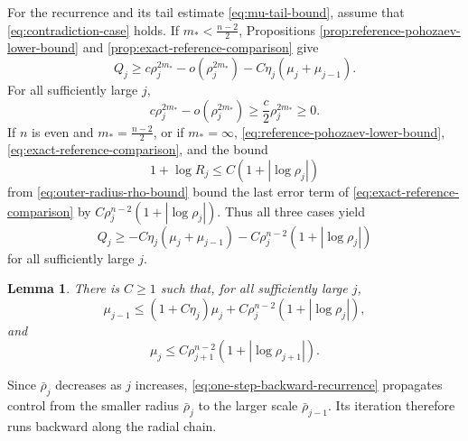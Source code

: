 \documentclass[11pt]{article}
\numberwithin{equation}{section}
\newtheorem{lemma}[theorem]{Lemma}
\theoremstyle{remark}
\begin{document}
For the recurrence and its tail estimate \eqref{eq:mu-tail-bound}, assume that
\eqref{eq:contradiction-case} holds. If
\(m_*<\frac{n-2}{2}\), Propositions
\ref{prop:reference-pohozaev-lower-bound} and
\ref{prop:exact-reference-comparison} give
\[
 Q_j\ge c\rho_j^{2m_*}-o(\rho_j^{2m_*})
 -C\eta_j(\mu_j+\mu_{j-1}).
\]
For all sufficiently large \(j\),
\[
 c\rho_j^{2m_*}-o(\rho_j^{2m_*})
 \ge\frac c2\rho_j^{2m_*}\ge0.
\]
If \(n\) is even and \(m_*=\frac{n-2}{2}\), or if \(m_*=\infty\),
\eqref{eq:reference-pohozaev-lower-bound},
\eqref{eq:exact-reference-comparison}, and the bound
\[
 1+\log R_j\le C(1+|\log\rho_j|)
\]
from \eqref{eq:outer-radius-rho-bound} bound the last error term of \eqref{eq:exact-reference-comparison} by $C\rho_j^{n-2}(1+|\log\rho_j|)$.
Thus all three cases yield
\begin{equation}\label{eq:final-annular-increment}
 Q_j\ge-C\eta_j(\mu_j+\mu_{j-1})
 -C\rho_j^{n-2}(1+|\log\rho_j|)
\end{equation}
for all sufficiently large \(j\).

\par
\begin{lemma}\label{lem:backward-recurrence}
There is \(C\ge1\) such that, for all sufficiently large \(j\),
\begin{equation}\label{eq:one-step-backward-recurrence}
 \mu_{j-1}\le(1+C\eta_j)\mu_j
 +C\rho_j^{n-2}(1+|\log\rho_j|),
\end{equation}
and
\begin{equation}\label{eq:mu-tail-bound}
 \mu_j\le C\rho_{j+1}^{n-2}
 (1+|\log\rho_{j+1}|).
\end{equation}
\end{lemma}
Since \(\bar\rho_j\) decreases as \(j\) increases,
\eqref{eq:one-step-backward-recurrence} propagates control from the smaller
radius \(\bar\rho_j\) to the larger scale \(\bar\rho_{j-1}\).  Its
iteration therefore runs backward along the radial chain.
\end{document}
